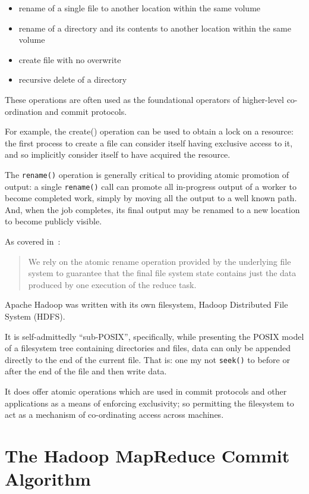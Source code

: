 \documentclass[9pt,technote]{IEEEtran}
\begin{document}
\begin{itemize}
  \item rename of a single file to another location within the same volume 
  \item rename of a directory and its contents to another location within the same volume 
  \item create file with no overwrite 
  \item recursive delete of a directory 
\end{itemize}

These operations are often used as the foundational operators of higher-level
co-ordination and commit protocols.

For example, the create() operation can be used to obtain a lock on a resource:
the first process to create a file can consider itself having exclusive access to it,
and so implicitly consider itself to have acquired the resource.

The \texttt{rename()} operation is generally critical to providing atomic promotion
of output: a single \texttt{rename()} call can promote all in-progress output
of a worker to become completed work, simply by moving all the output to a well known path.
And, when the job completes, its final output may be renamed to a new location to become
publicly visible.

As covered in\ \cite{Dean:2004:MSD:1251254.1251264}:

\begin{quote}
We rely on the atomic rename operation provided by the underlying file system
to guarantee that the final file system state contains just the data produced
by one execution of the reduce task.
\end{quote}


Apache Hadoop was written with its own filesystem, Hadoop Distributed File System (HDFS).

It is self-admittedly ``sub-POSIX'', specifically, while presenting the POSIX
model of a filesystem tree containing directories and files, data can only be
appended directly to the end of the current file.
That is: one my not \texttt{seek()} to before or after the end of the file and
then write data.

It does offer atomic operations which are used in commit protocols and other
applications as a means of enforcing exclusivity;
so permitting the filesystem to act as a mechanism of co-ordinating access across machines.

\section{The Hadoop MapReduce Commit Algorithm}
\label{sec:mr}
\end{document}
